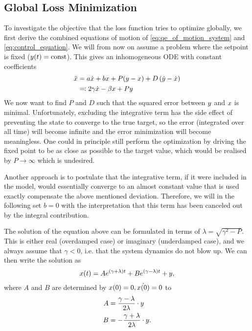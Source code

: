 \documentclass{article}
\begin{document}
  \subsection{Global Loss Minimization}
    \label{sq:L2Loss}
    To investigate the objective that the loss function tries to optimize globally, we first derive the combined 
    equations of motion of \eqref{eq:qe_of_motion_system} and \eqref{eq:control_equation}.
    We will from now on assume a problem where the setpoint is fixed ($y(t) = \operatorname{const}$).
    This gives an inhomogeneous ODE with constant coefficients 
    \begin{align}
        \ddot{x} &= a \dot{x} + b x + P (y - x) + D \left( \dot{y} - \dot{x} \right)\\ \nonumber
        &\eqqcolon 2\gamma  \dot{x} - \beta x + P y
    \end{align}
    We now want to find $P$ and $D$ such that the squared error between $y$ and $x$ is minimal.
    Unfortunately, excluding the integrative term has the side effect of preventing the state to converge to the true target, so the error (integrated over all time) will become infinite and the error minimization will become meaningless. 
    One could in principle still perform the optimization by driving the fixed point to be as close as possible to the target value, which would be realised by $P \rightarrow \infty$ which is undesired. 
    
    Another approach is to postulate that the integrative term, if it were included in the model, would essentially converge to an almost constant value that is used exactly compensate the above mentioned deviation.
    Therefore, we will in the following set $b=0$ with the interpretation that this term has been canceled out by the integral contribution.

    The solution of the equation above can be formulated in terms of $\lambda=\sqrt{\gamma^2-P}$. This is either real
    (overdamped case) or imaginary (underdamped case), and we always assume that $\gamma<0$, i.e. that the system 
    dynamics do not blow up. We can then write the solution as
    \begin{align}
        x(t) = A e^{(\gamma + \lambda) t} + B e^{(\gamma - \lambda) t} + y,   
    \end{align}
    where $A$ and $B$ are determined by $x(0) = 0, \dot{x(0)} = 0$ to
    \begin{align}
        A &= \frac{\gamma - \lambda}{2\lambda} \cdot y\\
        B &= -\frac{\gamma + \lambda}{2\lambda} \cdot y.
    \end{align}
\end{document}
